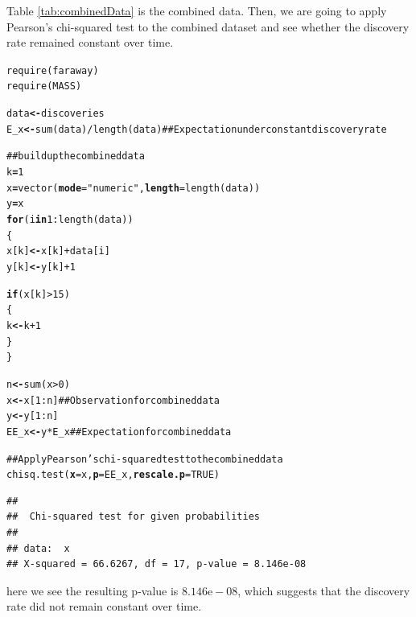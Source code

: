 \documentclass[12pt,oneside,a4paper]{article}\usepackage[]{graphicx}\usepackage[]{xcolor}
\makeatletter
\newcommand{\hlnum}[1]{\textcolor[rgb]{0,0,0}{#1}}%
\newcommand{\hlstr}[1]{\textcolor[rgb]{0,0,1}{#1}}%
\newcommand{\hlcom}[1]{\textcolor[rgb]{0.443,0.478,0.702}{#1}}%
\newcommand{\hlopt}[1]{\textcolor[rgb]{0,0,0}{#1}}%
\newcommand{\hlstd}[1]{\textcolor[rgb]{0,0,0}{#1}}%
\newcommand{\hlkwa}[1]{\textcolor[rgb]{0.498,0,0.333}{\textbf{#1}}}%
\newcommand{\hlkwb}[1]{\textcolor[rgb]{0.498,0,0.333}{\textbf{#1}}}%
\newcommand{\hlkwc}[1]{\textcolor[rgb]{0.498,0,0.333}{\textbf{#1}}}%
\newcommand{\hlkwd}[1]{\textcolor[rgb]{0,0,0}{#1}}%
\newenvironment{kframe}{%
 \def\at@end@of@kframe{}%
 \ifinner\ifhmode%
  \def\at@end@of@kframe{\end{minipage}}%
  \begin{minipage}{\columnwidth}%
 \fi\fi%
 \def\FrameCommand##1{\hskip\@totalleftmargin \hskip-\fboxsep
 \colorbox{shadecolor}{##1}\hskip-\fboxsep
     \hskip-\linewidth \hskip-\@totalleftmargin \hskip\columnwidth}%
 \MakeFramed {\advance\hsize-\width
   \@totalleftmargin\z@ \linewidth\hsize
   \@setminipage}}%
 {\par\unskip\endMakeFramed%
 \at@end@of@kframe}
\newenvironment{knitrout}{}{} %
\makeatother
\begin{document}
Table \ref{tab:combinedData} is the combined data. Then, we are going to apply Pearson's chi-squared test to the combined dataset and see whether the discovery rate remained constant over time.
\clearpage
\begin{knitrout}
\color{fgcolor}\begin{kframe}
\begin{alltt}
\hlkwd{require}\hlstd{(faraway)}
\hlkwd{require}\hlstd{(MASS)}

\hlstd{data} \hlkwb{<-} \hlstd{discoveries}
\hlstd{E_x} \hlkwb{<-} \hlkwd{sum}\hlstd{(data)} \hlopt{/} \hlkwd{length}\hlstd{(data)} \hlcom{## Expectation under constant discovery rate}

\hlcom{## build up the combined data}
\hlstd{k} \hlkwb{=} \hlnum{1}
\hlstd{x} \hlkwb{=} \hlkwd{vector}\hlstd{(}\hlkwc{mode} \hlstd{=} \hlstr{"numeric"}\hlstd{,} \hlkwc{length} \hlstd{=} \hlkwd{length}\hlstd{(data))}
\hlstd{y} \hlkwb{=} \hlstd{x}
\hlkwa{for} \hlstd{(i} \hlkwa{in} \hlnum{1}\hlopt{:}\hlkwd{length}\hlstd{(data))}
\hlstd{\{}
    \hlstd{x[k]} \hlkwb{<-} \hlstd{x[k]} \hlopt{+} \hlstd{data[i]}
    \hlstd{y[k]} \hlkwb{<-} \hlstd{y[k]} \hlopt{+} \hlnum{1}

    \hlkwa{if} \hlstd{(x[k]} \hlopt{>} \hlnum{15}\hlstd{)}
    \hlstd{\{}
        \hlstd{k} \hlkwb{<-} \hlstd{k} \hlopt{+} \hlnum{1}
    \hlstd{\}}
\hlstd{\}}

\hlstd{n} \hlkwb{<-} \hlkwd{sum}\hlstd{(x} \hlopt{>} \hlnum{0}\hlstd{)}
\hlstd{x} \hlkwb{<-} \hlstd{x[}\hlnum{1} \hlopt{:} \hlstd{n]} \hlcom{## Observation for combined data}
\hlstd{y} \hlkwb{<-} \hlstd{y[}\hlnum{1} \hlopt{:} \hlstd{n]}
\hlstd{EE_x} \hlkwb{<-} \hlstd{y} \hlopt{*} \hlstd{E_x} \hlcom{## Expectation for combined data}

\hlcom{## Apply Pearson's chi-squared test to the combined data}
\hlkwd{chisq.test}\hlstd{(}\hlkwc{x} \hlstd{= x,} \hlkwc{p} \hlstd{= EE_x,} \hlkwc{rescale.p} \hlstd{=} \hlnum{TRUE}\hlstd{)}
\end{alltt}
\begin{verbatim}
## 
## 	Chi-squared test for given probabilities
## 
## data:  x
## X-squared = 66.6267, df = 17, p-value = 8.146e-08
\end{verbatim}
\end{kframe}
\end{knitrout}

here we see the resulting p-value is $8.146\textrm{e}-08$, which suggests that the discovery rate did not remain constant over time.
\end{document}

